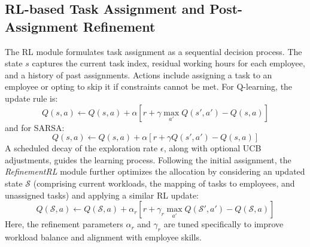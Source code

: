 \documentclass[%
aip,
cp,  %
reprint
]{revtex4-2}
\begin{document}
	\subsection{\label{subsec:rl-task}RL-based Task Assignment and Post-Assignment Refinement}
	
	The RL module formulates task assignment as a sequential decision process. The state $s$ captures the current task index, residual working hours for each employee, and a history of past assignments. Actions include assigning a task to an employee or opting to skip it if constraints cannot be met. For Q-learning, the update rule is:
	\begin{equation}
		Q(s,a) \leftarrow Q(s,a) + \alpha \left[r + \gamma \max_{a'} Q(s',a') - Q(s,a)\right]
	\end{equation}
	and for SARSA:
	\begin{equation}
		Q(s,a) \leftarrow Q(s,a) + \alpha \left[r + \gamma Q(s',a') - Q(s,a)\right]
	\end{equation}
	A scheduled decay of the exploration rate $\epsilon$, along with optional UCB adjustments, guides the learning process. Following the initial assignment, the \emph{RefinementRL} module further optimizes the allocation by considering an updated state $\mathcal{S}$ (comprising current workloads, the mapping of tasks to employees, and unassigned tasks) and applying a similar RL update:
	\begin{equation}
		Q(\mathcal{S},a) \leftarrow Q(\mathcal{S},a) + \alpha_r \left[r + \gamma_r \max_{a'} Q(\mathcal{S}',a') - Q(\mathcal{S},a)\right]
	\end{equation}
	Here, the refinement parameters $\alpha_r$ and $\gamma_r$ are tuned specifically to improve workload balance and alignment with employee skills.
	
\end{document}
